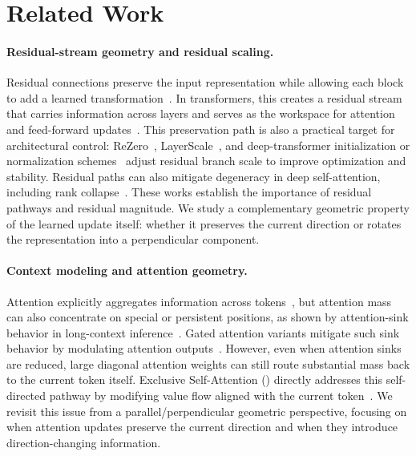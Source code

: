 \section{Related Work}
\label{sec:related}

\paragraph{Residual-stream geometry and residual scaling.}
Residual connections preserve the input representation while allowing each
block to add a learned transformation~\citep{he2016deep}. In transformers, this
creates a residual stream that carries information across layers and serves as
the workspace for attention and feed-forward
updates~\citep{elhage2021mathematical}. This preservation path is also a practical
target for architectural control: ReZero~\citep{Bachlechner2020ReZeroIA},
LayerScale~\citep{touvron2021going}, and deep-transformer initialization or
normalization schemes~\citep{xiong2020on,Wang2022DeepNetST} adjust residual
branch scale to improve optimization and stability. Residual paths can also
mitigate degeneracy in deep self-attention, including rank
collapse~\citep{dong2021attention}. These works establish the importance of
residual pathways and residual magnitude. We study a complementary geometric
property of the learned update itself: whether it preserves the current
direction or rotates the representation into a perpendicular component.

\paragraph{Context modeling and attention geometry.}
Attention explicitly aggregates information across
tokens~\citep{vaswani2017attention}, but attention mass can also concentrate
on special or persistent positions, as shown by attention-sink behavior in
long-context inference~\citep{xiao2023efficient}. Gated attention variants
mitigate such sink behavior by modulating attention
outputs~\citep{qiu2025gatedattention}. However, even when attention sinks are reduced,
large diagonal attention weights can still route substantial mass back to the
current token itself. Exclusive Self-Attention (\xsa{}) directly addresses this
self-directed pathway by modifying value flow aligned with the current
token~\citep{zhai2025xsa}. We revisit this issue from a
parallel/perpendicular geometric perspective, focusing on when attention
updates preserve the current direction and when they introduce
direction-changing information.
